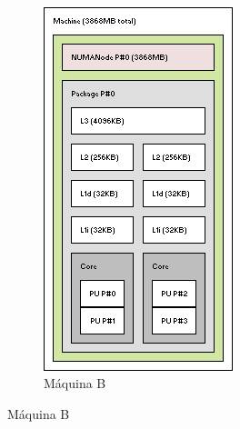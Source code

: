 \begin{figure}
	~
	\begin{subfigure}{.4\textwidth}
		\caption{Máquina B}
		\includegraphics[width=\textwidth]{rec/img/MaqB}
	\end{subfigure}

\end{figure}


